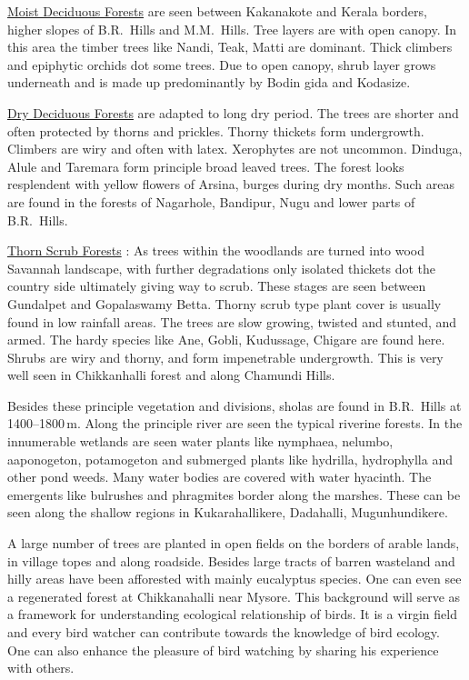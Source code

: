 \underline{Moist Deciduous Forests} are seen between Kakanakote and
Kerala borders, higher slopes of B.R.\ Hills and M.M.\ Hills. Tree 
layers are with open canopy. In this area the timber trees like 
Nandi, Teak, Matti are dominant. Thick climbers and epiphytic 
orchids dot some trees. Due to open canopy, shrub layer grows 
underneath and is made up predominantly by Bodin gida and Kodasize. 

\underline{Dry Deciduous Forests} are adapted to long dry period. The 
trees are shorter and often protected by thorns and prickles. 
Thorny thickets form undergrowth. Climbers are wiry and often 
with latex. Xerophytes are not uncommon. Dinduga, Alule and 
Taremara form principle broad leaved trees. The forest looks 
resplendent with yellow flowers of Arsina, burges during dry 
months. Such areas are found in the forests of Nagarhole, Bandipur, 
Nugu and lower parts of B.R.\ Hills. 

\underline{Thorn Scrub Forests} : As trees within the woodlands are turned 
into wood Savannah landscape, with further degradations only isolated 
thickets dot the country side ultimately giving way to 
scrub. These stages are seen between Gundalpet and Gopalaswamy 
Betta. Thorny scrub type plant cover is usually found in low 
rainfall areas. The trees are slow growing, twisted and stunted, 
and armed. The hardy species like Ane, Gobli, Kudussage, Chigare 
are found here. Shrubs are wiry and thorny, and form impenetrable 
undergrowth. This is very well seen in Chikkanhalli forest and 
along Chamundi Hills. 

Besides these principle vegetation and divisions, sholas are 
found in B.R.\ Hills at 1400--1800\,m. Along the principle river 
are seen the typical riverine forests. In the innumerable wetlands 
are seen water plants like nymphaea, nelumbo, aaponogeton, 
potamogeton and submerged plants like hydrilla, hydrophylla and 
other pond weeds. Many water bodies are covered with water hyacinth. 
The emergents like bulrushes and phragmites border along 
the marshes. These can be seen along the shallow regions in 
Kukarahallikere, Dadahalli, Mugunhundikere. 

A large number of trees are planted in open fields on the 
borders of arable lands, in village topes and along roadside. Besides 
large tracts of barren wasteland and hilly areas have been 
afforested with mainly eucalyptus species. One can even see a 
regenerated forest at Chikkanahalli near Mysore. This background 
will serve as a framework for understanding ecological relationship 
of birds. It is a virgin field and every bird watcher can 
contribute towards the knowledge of bird ecology. One can also 
enhance the pleasure of bird watching by sharing his experience 
with others. 

